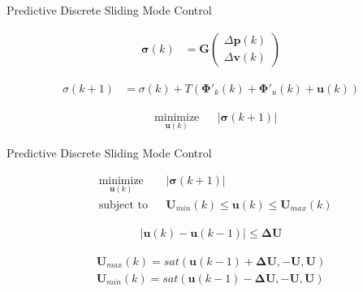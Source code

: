 \documentclass[12pt,svgnames,table,draft=false]{beamer}
\newcommand{\mbf}[1]{\mathbf{#1}}
\providecommand{\mbf}[1]{\mathbf{#1}}
\newcommand{\idxSample}{{\ensuremath{k}}}
\begin{document}
\begin{frame}{Predictive Discrete Sliding Mode Control}
\centering
\begin{tcolorbox}[colback=blue!5!white,colframe=blue!75!black,title=What it looks like, width=.8\paperwidth]

\begin{align}
\mbf{\sigma}(\idxSample) &= \mbf{G}
\begin{pmatrix}
\Delta \mbf{p}(\idxSample)\\
\Delta \mbf{v}(\idxSample)
\end{pmatrix} \nonumber
\end{align}

\begin{align}
{{\sigma}}(\idxSample+1)
&=
{{\sigma}}(\idxSample)
+
T(
\mbf{\Phi}'_k(\idxSample) + \mbf{\Phi}'_u(\idxSample) + \mbf{u}(\idxSample))
\nonumber
\end{align}

\begin{align}
& \underset{\mbf{u}(\idxSample)}{\text{minimize}}
& & |\mbf{\sigma}(\idxSample+1)| \nonumber 
\end{align}

\end{tcolorbox}

\end{frame}

\begin{frame}{Predictive Discrete Sliding Mode Control}
\centering
\begin{tcolorbox}[colback=blue!5!white,colframe=blue!75!black,title=Adding hard magnitude and rate constraints \cite{Bolting2016}, width=.8\paperwidth]

\begin{align}
& \underset{\mbf{u}(\idxSample)}{\text{minimize}}
& & |\mbf{\sigma}(\idxSample+1)| \nonumber \\
& \text{subject to}
& & \mbf{U}_{min}(\idxSample) \leq \mbf{u}(\idxSample) \leq \mbf{U}_{max}(\idxSample) 
\nonumber
\end{align}

\begin{align}
|\mbf{u}(\idxSample) - \mbf{u}(\idxSample-1)| \leq \mbf{\Delta U} \nonumber
\end{align}

\begin{align}
\mbf{U}_{max}(\idxSample) = sat(\mbf{u}(\idxSample-1) + \mbf{\Delta U}, -\mbf{U}, \mbf{U}) \nonumber \\
\mbf{U}_{min}(\idxSample) = sat(\mbf{u}(\idxSample-1) - \mbf{\Delta U}, -\mbf{U}, \mbf{U}) \nonumber
\end{align}

\end{tcolorbox}
\end{frame}
\end{document}
